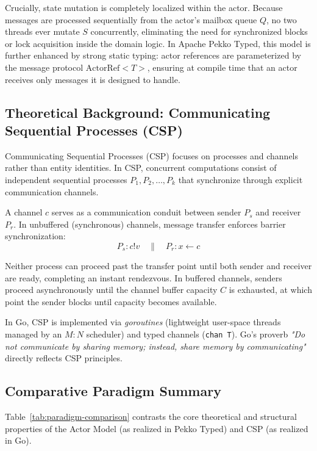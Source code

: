 \documentclass[11pt,a4paper]{article}
\begin{document}
Crucially, state mutation is completely localized within the actor. Because messages are processed sequentially from the actor's mailbox queue $Q$, no two threads ever mutate $S$ concurrently, eliminating the need for synchronized blocks or lock acquisition inside the domain logic. In Apache Pekko Typed, this model is further enhanced by strong static typing: actor references are parameterized by the message protocol $\text{ActorRef}<T>$, ensuring at compile time that an actor receives only messages it is designed to handle.

\subsection{Theoretical Background: Communicating Sequential Processes (CSP)}

Communicating Sequential Processes (CSP) focuses on processes and channels rather than entity identities. In CSP, concurrent computations consist of independent sequential processes $P_1, P_2, \dots, P_k$ that synchronize through explicit communication channels. 

A channel $c$ serves as a communication conduit between sender $P_s$ and receiver $P_r$. In unbuffered (synchronous) channels, message transfer enforces barrier synchronization:
\begin{equation}
P_s: c ! v \quad \parallel \quad P_r: x \leftarrow c
\end{equation}

Neither process can proceed past the transfer point until both sender and receiver are ready, completing an instant rendezvous. In buffered channels, senders proceed asynchronously until the channel buffer capacity $C$ is exhausted, at which point the sender blocks until capacity becomes available.

In Go, CSP is implemented via \emph{goroutines} (lightweight user-space threads managed by an $M:N$ scheduler) and typed channels (\texttt{chan T}). Go's proverb \emph{"Do not communicate by sharing memory; instead, share memory by communicating"} directly reflects CSP principles.

\subsection{Comparative Paradigm Summary}

Table~\ref{tab:paradigm-comparison} contrasts the core theoretical and structural properties of the Actor Model (as realized in Pekko Typed) and CSP (as realized in Go).
\end{document}
